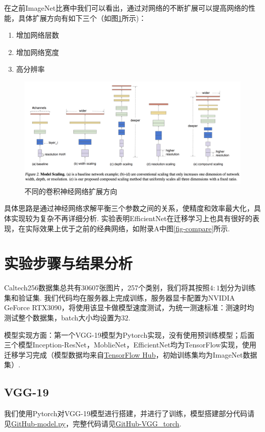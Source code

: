\documentclass[12pt, a4paper, oneside]{ctexart}
\numberwithin{equation}{section}  %
\begin{document}
在之前ImageNet比赛中我们可以看出，通过对网络的不断扩展可以提高网络的性能，具体扩展方向有如下三个（如图\ref{fig-EfficientNet}所示)：
\begin{enumerate}
  \item 增加网络层数
  \item 增加网络宽度
  \item 高分辨率
\end{enumerate}
\begin{figure}[htbp]
  \vspace*{-1cm}
  \hspace*{-2cm}
  \centering
  \includegraphics[scale=0.4]{EfficientNet.png}
  \caption{不同的卷积神经网络扩展方向}
  \label{fig-EfficientNet}
\end{figure}

具体思路是通过神经网络求解平衡三个参数之间的关系，使精度和效率最大化，具体实现较为复杂不再详细分析. 实验表明EfficientNet在迁移学习上也具有很好的表现，在实际效果上优于之前的经典网络，如附录A中图\ref{fig-compare}所示.\vspace*{-0.5cm}

\section{实验步骤与结果分析}
Caltech256数据集总共有30607张图片，257个类别，我们将其按照$4:1$划分为训练集和验证集. 我们代码均在服务器上完成训练，服务器显卡配置为NVIDIA GeForce RTX3090，将使用该显卡做模型速度测试，为统一测速标准：测速时均测试整个数据集，batch大小均设置为$32$.

模型实现方面：第一个VGG-19模型为Pytorch实现，没有使用预训练模型；后面三个模型Inception-ResNet，MoblieNet，EfficientNet均为TensorFlow实现，使用迁移学习完成（模型数据均来自\href{https://tfhub.dev/}{TensorFlow Hub}，初始训练集均为ImageNet数据集）.

\subsection{VGG-19}
我们使用Pytorch对VGG-19模型进行搭建，并进行了训练，模型搭建部分代码请见\href{https://github.com/wty-yy/CVPR_homeworks/blob/master/code/hw4/VGG_torch/model.py}{GitHub-model.py}，完整代码请见\href{https://github.com/wty-yy/CVPR_homeworks/tree/master/code/hw4/VGG_torch}{GitHub-VGG\_torch}.
\end{document}
